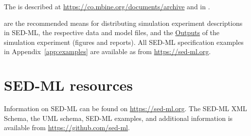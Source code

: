 The  is described at \url{https://co.mbine.org/documents/archive} and 
in \citep{Bergmann2014}.

 are the recommended means for distributing simulation experiment descriptions in SED-ML, the respective data and model files, and the \hyperref[class:output]{Outputs} of the simulation experiment (figures and reports). All SED-ML specification examples in Appendix~\ref{app:examples} are available as  from \url{https://sed-ml.org}.

\section{SED-ML resources}
\label{sec:resources}

Information on SED-ML can be found on \url{https://sed-ml.org}. The SED-ML XML Schema, the UML schema, SED-ML examples, and additional information is available from \url{https://github.com/sed-ml}.
